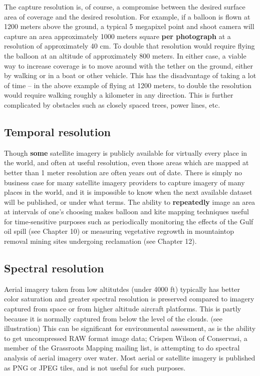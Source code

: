 \documentclass[11pt]{report}
\begin{document}

The capture resolution is, of course, a compromise between the desired surface area of coverage and the desired resolution. For example, if a balloon is flown at 1200 meters above the ground, a typical 5 megapixel point and shoot camera will capture an area approximately 1000 meters square \textbf{per photograph} at a resolution of approximately 40 cm. To double that resolution would require flying the balloon at an altitude of approximately 800 meters. In either case, a viable way to increase coverage is to move around with the tether on the ground, either by walking or in a boat or other vehicle. This has the disadvantage of taking a lot of time -- in the above example of flying at 1200 meters, to double the resolution would require walking roughly a kilometer in any direction. This is further complicated by obstacles such as closely spaced trees, power lines, etc.



\subsection{Temporal resolution}

Though \textbf{some} satellite imagery is publicly available for virtually every place in the world, and often at useful resolution, even those areas which are mapped at better than 1 meter resolution are often years out of date. There is simply no business case for many satellite imagery providers to capture imagery of many places in the world, and it is impossible to know when the next available dataset will be published, or under what terms. \cite{oconnor2008maps} The ability to \textbf{repeatedly} image an area at intervals of one's choosing makes balloon and kite mapping techniques useful for time-sensitive purposes such as periodically monitoring the effects of the Gulf oil spill (see Chapter 10) or measuring vegetative regrowth in mountaintop removal mining sites undergoing reclamation (see Chapter 12). 

\subsection{Spectral resolution}

Aerial imagery taken from low altitutdes (under 4000 ft) typically has better color saturation and greater spectral resolution is preserved compared to imagery captured from space or from higher altitude aircraft platforms. This is partly because it is normally captured from below the level of the clouds. (see illustration) This can be significant for environmental assessment, as is the ability to get uncompressed RAW format image data; Crispen Wilson of Conservasi, a  member of the Grassroots Mapping mailing list, is attempting to do spectral analysis of aerial imagery over water. Most aerial or satellite imagery is published as PNG or JPEG tiles, and is not useful for such purposes.  
\end{document}
